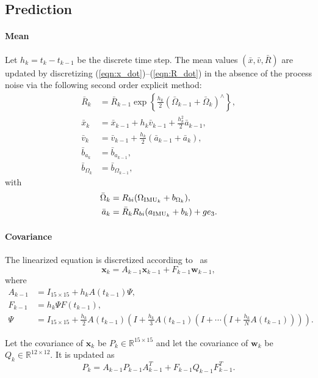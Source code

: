\documentclass[11pt]{article}
\newcommand{\braces}[1]{\ensuremath{\left\{ #1 \right\}}}
\newcommand{\parenth}[1]{\ensuremath{\left( #1 \right)}}
\renewcommand{\Re}{\ensuremath{\mathbb{R}}}
\newcommand{\refeqn}[1]{(\ref{eqn:#1})}
\newcommand{\x}{\mathbf{x}}
\newcommand{\w}{\mathbf{w}}
\begin{document}
\subsection{Prediction} 

\paragraph{Mean}
Let $h_k=t_{k}-t_{k-1}$ be the discrete time step. The mean values $(\bar x, \bar v, \bar R)$ are updated by discretizing \refeqn{x_dot}--\refeqn{R_dot} in the absence of the process noise via the following second order explicit method:
\begin{align}
\bar R_{k} & = \bar R_{k-1} \exp\braces{\frac{h_k}{2} (\bar\Omega_{k-1}+\bar\Omega_k)^\wedge},\\
\bar x_k & = \bar x_{k-1} + h_k \bar v_{k-1} +\frac{h_k^2}{2}\bar a_{k-1},\\
\bar v_k & = \bar v_{k-1} + \frac{h_k}{2} (\bar a_{k-1} + \bar a_k),\\
\bar b_{a_k} & = \bar b_{a_{k-1}},\\
\bar b_{\Omega_k} & = \bar b_{\Omega_{k-1}},
\end{align}
with
\begin{align}
\bar \Omega_k &= R_{bi}(\Omega_{\mathrm{IMU}_k} + b_{\Omega_k}),\label{eqn:W_bar}\\
\bar a_k &=  \bar R_{k}R_{bi}(a_{\mathrm{IMU}_{k}}+b_{k}) + g e_3.
\end{align}

\paragraph{Covariance}

The linearized equation is discretized according to~\cite[p 330]{Bro91} as
\begin{equation}
\x_{k} = A_{k-1} \x_{k-1} + F_{k-1} \w_{k-1},
\end{equation}
where
\begin{align}
A_{k-1} & = I_{15\times 15} + h_k A(t_{k-1}) \Psi,\\
F_{k-1} & = h_k \Psi F(t_{k-1}),\\
\Psi & = I_{15\times 15} + \frac{h_k}{2} A(t_{k-1}) \parenth{ I + \frac{h_k}{3} A(t_{k-1})\parenth{I+\cdots\parenth{I+\frac{h_k}{N}A(t_{k-1})}}}.
\end{align}

Let the covariance of $\x_k$ be $P_k\in\Re^{15\times 15}$ and let the covariance of $\w_k$ be $Q_k\in\Re^{12\times 12}$. It is updated as
\begin{equation}
P_k = A_{k-1} P_{k-1} A_{k-1}^T + F_{k-1} Q_{k-1} F_{k-1}^T. 
\end{equation}
\end{document}
